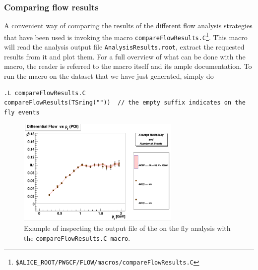 \documentclass[a5paper]{book}
\numberwithin{equation}{subsection}
\begin{document}
\subsubsection{Comparing flow results}
A convenient way of comparing the results of the different flow analysis strategies that have been used is invoking the macro \texttt{compareFlowResults.C}\footnote{\texttt{\$ALICE\_ROOT/PWGCF/FLOW/macros/compareFlowResults.C}}.  This macro will read the analysis output file \texttt{AnalysisResults.root}, extract the requested results from it and plot them. For a full overview of what can be done with the macro, the reader is referred to the macro itself and its ample documentation. To run the macro on the dataset that we have just generated, simply do
\begin{lstlisting}
.L compareFlowResults.C
compareFlowResults(TSring(""))	// the empty suffix indicates on the fly events \end{lstlisting}

\begin{figure}
 \includegraphics[width=0.70\textwidth]{figs/compareFlowResults.png}
 \caption[Comparing on the fly flow results]{Example of inspecting the output file of the on the fly analysis with the \texttt{compareFlowResults.C macro}.}
 \label{fig:browserExample}
\end{figure}
\end{document}
